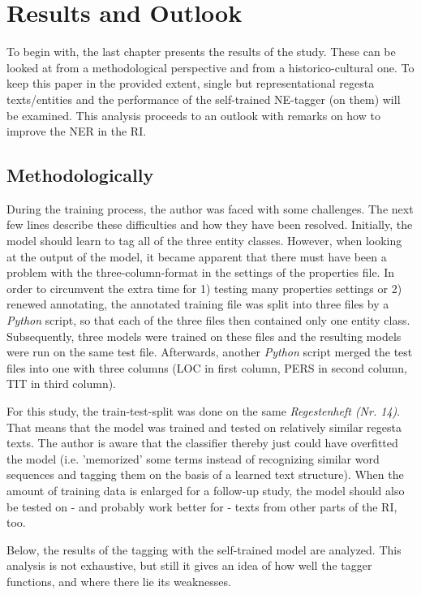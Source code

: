 \documentclass[11pt,a4paper]{article}
\begin{document}
\section{Results and Outlook}
\label{cha:results}
To begin with, the last chapter presents the results of the study. These can be looked at from a methodological perspective and from a historico-cultural one. To keep this paper in the provided extent, single but representational regesta texts/entities and the performance of the self-trained NE-tagger (on them) will be examined. This analysis proceeds to an outlook with remarks on how to improve the NER in the RI.
\subsection{Methodologically}
During the training process, the author was faced with some challenges. The next few lines describe these difficulties and how they have been resolved. Initially, the model should learn to tag all of the three entity classes. However, when looking at the output of the model, it became apparent that there must have been a problem with the three-column-format in the settings of the properties file. In order to circumvent the extra time for 1) testing many properties settings or 2) renewed annotating, the annotated training file was split into three files by a \textit{Python} script, so that each of the three files then contained only one entity class. Subsequently, three models were trained on these files and the resulting models were run on the same test file. Afterwards, another \textit{Python} script merged the test files into one with three columns (LOC in first column, PERS in second column, TIT in third column).

For this study, the train-test-split was done on the same \textit{Regestenheft (Nr. 14)}. That means that the model was trained and tested on relatively similar regesta texts. The author is aware that the classifier thereby just could have overfitted the model (i.e. 'memorized' some terms instead of recognizing similar word sequences and tagging them on the basis of a learned text structure). When the amount of training data is enlarged for a follow-up study, the model should also be tested on - and probably work better for - texts from other parts of the RI, too.

Below, the results of the tagging with the self-trained model are analyzed. This analysis is not exhaustive, but still it gives an idea of how well the tagger functions, and where there lie its weaknesses.
\end{document}
